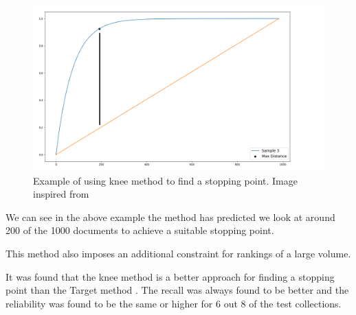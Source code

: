 \begin{figure}[H]
\center
\includegraphics[width=13cm]{figures/knee.png}
\caption{Example of using knee method to find a stopping point. Image inspired from \cite{Satopa11}}
\end{figure}

We can see in the above example the method has predicted we look at around 200 of the 1000 documents to achieve a suitable stopping point.

This method also imposes an additional constraint for rankings of a large volume. 

It was found that the knee method is a better approach for finding a stopping point than the Target method \cite{Cormack2016}. The recall was always found to be better and the reliability was found to be the same or higher for 6 out 8 of the test collections.



